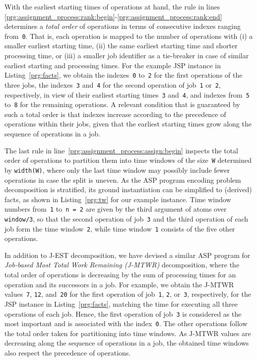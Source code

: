 \documentclass{tlp} %
\begin{document}
With the earliest starting times of operations at hand,
the rule in lines \ref{prg:assignment_process:rank:begin}-\ref{prg:assignment_process:rank:end}
determines a \emph{total order} of operations in terms of consecutive indexes ranging
from~\lstinline{0}.
That is, each operation is mapped to the number of operations with
(i) a smaller earliest starting time,
(ii) the same earliest starting time and shorter processing time, or
(iii) a smaller job identifier as a tie-breaker in case of similar
earliest starting and processing times.
For the example JSP instance in Listing~\ref{prg:facts},
we obtain the indexes~\lstinline{0} to~\lstinline{2} for the first operations of the
three jobs,
the indexes~\lstinline{3} and~\lstinline{4} for the second operation of
job~\lstinline{1} or~\lstinline{2}, respectively,
in view of their earliest starting times~\lstinline{3} and~\lstinline{4},
and indexes from~\lstinline{5} to~\lstinline{8} for the remaining operations.
A relevant condition that is guaranteed by such a total order is that
indexes increase according to the precedence of operations within their jobs,
given that the earliest starting times grow along the sequence of operations in a job.

The last rule in line~\ref{prg:assignment_process:assign:begin} inspects the total
order of operations to partition them into time windows of the size~\lstinline{W}
determined by \lstinline{width(W)},
where only the last time window may possibly include fewer operations in case the
split is uneven.
As the ASP program encoding problem decomposition is stratified, its ground
instantiation can be simplified to (derived) facts, as shown in Listing~\ref{prg:tw}
for our example instance.
Time window numbers from~\lstinline{1} to~\lstinline{n = 2} are given by
the third argument of atoms over \lstinline{window/3}, so that the second operation
of job~\lstinline{3} and the third operation of each job form the time window~\lstinline{2},
while time window~\lstinline{1} consists of the five other operations.
%


In addition to J-EST decomposition, we have devised a similar ASP program for
\emph{Job-based Most Total Work Remaining (J-MTWR)} decomposition,
where the total order of operations is decreasing by the sum of processing
times for an operation and its successors in a job.
For example, we obtain the J-MTWR values~\lstinline{7}, \lstinline{12}, and~\lstinline{20}
for the first operation of job~\lstinline{1}, \lstinline{2}, or~\lstinline{3},
respectively, for the JSP instance in Listing~\ref{prg:facts},
matching the time for executing all three operations of each job.
Hence, the first operation of job~\lstinline{3} is considered as the most
important and is associated with the index~\lstinline{0}. The other
operations follow the total order taken for partitioning into time windows.
As J-MTWR values are decreasing along the sequence of operations in a job, the obtained time windows also respect the precedence of operations.
\end{document}
